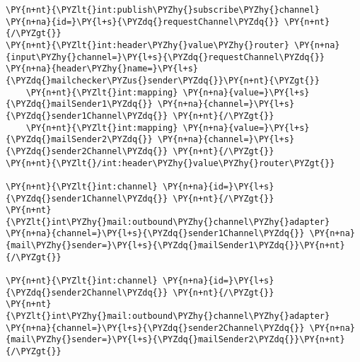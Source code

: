 \begin{Verbatim}[commandchars=\\\{\}]
\PY{n+nt}{\PYZlt{}int:publish\PYZhy{}subscribe\PYZhy{}channel} \PY{n+na}{id=}\PY{l+s}{\PYZdq{}requestChannel\PYZdq{}} \PY{n+nt}{/\PYZgt{}}
\PY{n+nt}{\PYZlt{}int:header\PYZhy{}value\PYZhy{}router} \PY{n+na}{input\PYZhy{}channel=}\PY{l+s}{\PYZdq{}requestChannel\PYZdq{}} \PY{n+na}{header\PYZhy{}name=}\PY{l+s}{\PYZdq{}mailchecker\PYZus{}sender\PYZdq{}}\PY{n+nt}{\PYZgt{}}
    \PY{n+nt}{\PYZlt{}int:mapping} \PY{n+na}{value=}\PY{l+s}{\PYZdq{}mailSender1\PYZdq{}} \PY{n+na}{channel=}\PY{l+s}{\PYZdq{}sender1Channel\PYZdq{}} \PY{n+nt}{/\PYZgt{}}
    \PY{n+nt}{\PYZlt{}int:mapping} \PY{n+na}{value=}\PY{l+s}{\PYZdq{}mailSender2\PYZdq{}} \PY{n+na}{channel=}\PY{l+s}{\PYZdq{}sender2Channel\PYZdq{}} \PY{n+nt}{/\PYZgt{}}
\PY{n+nt}{\PYZlt{}/int:header\PYZhy{}value\PYZhy{}router\PYZgt{}}

\PY{n+nt}{\PYZlt{}int:channel} \PY{n+na}{id=}\PY{l+s}{\PYZdq{}sender1Channel\PYZdq{}} \PY{n+nt}{/\PYZgt{}}
\PY{n+nt}{\PYZlt{}int\PYZhy{}mail:outbound\PYZhy{}channel\PYZhy{}adapter} \PY{n+na}{channel=}\PY{l+s}{\PYZdq{}sender1Channel\PYZdq{}} \PY{n+na}{mail\PYZhy{}sender=}\PY{l+s}{\PYZdq{}mailSender1\PYZdq{}}\PY{n+nt}{/\PYZgt{}}

\PY{n+nt}{\PYZlt{}int:channel} \PY{n+na}{id=}\PY{l+s}{\PYZdq{}sender2Channel\PYZdq{}} \PY{n+nt}{/\PYZgt{}}
\PY{n+nt}{\PYZlt{}int\PYZhy{}mail:outbound\PYZhy{}channel\PYZhy{}adapter} \PY{n+na}{channel=}\PY{l+s}{\PYZdq{}sender2Channel\PYZdq{}} \PY{n+na}{mail\PYZhy{}sender=}\PY{l+s}{\PYZdq{}mailSender2\PYZdq{}}\PY{n+nt}{/\PYZgt{}}
\end{Verbatim}
